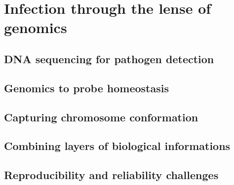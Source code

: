 
\chapter{Infection through the lense of genomics} %

\label{ch:01-02} %


\section{DNA sequencing for pathogen detection}

\section{Genomics to probe homeostasis}

\section{Capturing chromosome conformation}

\section{Combining layers of biological informations}

\section{Reproducibility and reliability challenges}
\blindtext
